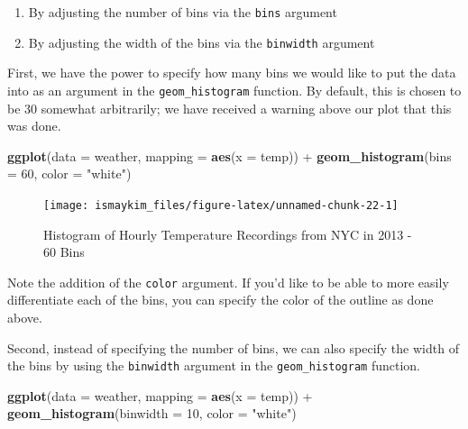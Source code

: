 \documentclass[]{tufte-book}
\newenvironment{Shaded}{\begin{snugshade}}{\end{snugshade}}
\newcommand{\KeywordTok}[1]{\textcolor[rgb]{0.13,0.29,0.53}{\textbf{{#1}}}}
\newcommand{\DataTypeTok}[1]{\textcolor[rgb]{0.13,0.29,0.53}{{#1}}}
\newcommand{\DecValTok}[1]{\textcolor[rgb]{0.00,0.00,0.81}{{#1}}}
\newcommand{\StringTok}[1]{\textcolor[rgb]{0.31,0.60,0.02}{{#1}}}
\newcommand{\NormalTok}[1]{{#1}}
\providecommand{\tightlist}{%
  \setlength{\itemsep}{0pt}\setlength{\parskip}{0pt}}
\begin{document}
\begin{enumerate}
\def\labelenumi{\arabic{enumi}.}
\tightlist
\item
  By adjusting the number of bins via the \texttt{bins} argument
\item
  By adjusting the width of the bins via the \texttt{binwidth} argument
\end{enumerate}

First, we have the power to specify how many bins we would like to put
the data into as an argument in the \texttt{geom\_histogram} function.
By default, this is chosen to be 30 somewhat arbitrarily; we have
received a warning above our plot that this was done.

\begin{Shaded}
\begin{Highlighting}[]
\KeywordTok{ggplot}\NormalTok{(}\DataTypeTok{data =} \NormalTok{weather, }\DataTypeTok{mapping =} \KeywordTok{aes}\NormalTok{(}\DataTypeTok{x =} \NormalTok{temp)) +}
\StringTok{  }\KeywordTok{geom_histogram}\NormalTok{(}\DataTypeTok{bins =} \DecValTok{60}\NormalTok{, }\DataTypeTok{color =} \StringTok{"white"}\NormalTok{)}
\end{Highlighting}
\end{Shaded}

\begin{figure}

{\centering \texttt{[image: ismaykim\_files/figure-latex/unnamed-chunk-22-1]} 

}

\caption[Histogram of Hourly Temperature Recordings from NYC in 2013 - 60 Bins]{Histogram of Hourly Temperature Recordings from NYC in 2013 - 60 Bins}\label{fig:unnamed-chunk-22}
\end{figure}

Note the addition of the \texttt{color} argument. If you'd like to be
able to more easily differentiate each of the bins, you can specify the
color of the outline as done above.

Second, instead of specifying the number of bins, we can also specify
the width of the bins by using the \texttt{binwidth} argument in the
\texttt{geom\_histogram} function.

\begin{Shaded}
\begin{Highlighting}[]
\KeywordTok{ggplot}\NormalTok{(}\DataTypeTok{data =} \NormalTok{weather, }\DataTypeTok{mapping =} \KeywordTok{aes}\NormalTok{(}\DataTypeTok{x =} \NormalTok{temp)) +}
\StringTok{  }\KeywordTok{geom_histogram}\NormalTok{(}\DataTypeTok{binwidth =} \DecValTok{10}\NormalTok{, }\DataTypeTok{color =} \StringTok{"white"}\NormalTok{)}
\end{Highlighting}
\end{Shaded}
\end{document}
